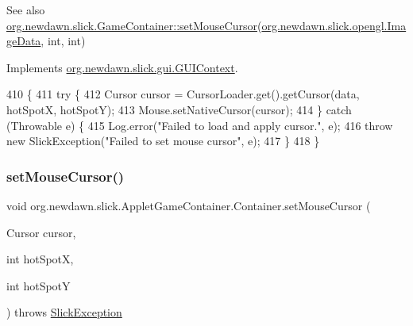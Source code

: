 \begin{DoxySeeAlso}{See also}
\mbox{\hyperlink{classorg_1_1newdawn_1_1slick_1_1_game_container_a13e789e67755f14bad1caf70e3bd6d4e}{org.\+newdawn.\+slick.\+Game\+Container\+::set\+Mouse\+Cursor}}(\mbox{\hyperlink{interfaceorg_1_1newdawn_1_1slick_1_1opengl_1_1_image_data}{org.\+newdawn.\+slick.\+opengl.\+Image\+Data}}, int, int) 
\end{DoxySeeAlso}


Implements \mbox{\hyperlink{interfaceorg_1_1newdawn_1_1slick_1_1gui_1_1_g_u_i_context_a06020a7f3e4688fa7aa76f9c07b3958a}{org.\+newdawn.\+slick.\+gui.\+G\+U\+I\+Context}}.


\begin{DoxyCode}
410                                                                                                    \{
411          \textcolor{keywordflow}{try} \{
412             Cursor cursor = CursorLoader.get().getCursor(data, hotSpotX, hotSpotY);
413             Mouse.setNativeCursor(cursor);
414          \} \textcolor{keywordflow}{catch} (Throwable e) \{
415             Log.error(\textcolor{stringliteral}{"Failed to load and apply cursor."}, e);
416             \textcolor{keywordflow}{throw} \textcolor{keyword}{new} SlickException(\textcolor{stringliteral}{"Failed to set mouse cursor"}, e);
417          \}
418       \}
\end{DoxyCode}
\mbox{\label{classorg_1_1newdawn_1_1slick_1_1_applet_game_container_1_1_container_a94e9af2ee3d8b55e8d5a425ffb33207e}} 
\subsubsection{\texorpdfstring{set\+Mouse\+Cursor()}{setMouseCursor()}\hspace{0.1cm}{\footnotesize\ttfamily [4/4]}}
{\footnotesize\ttfamily void org.\+newdawn.\+slick.\+Applet\+Game\+Container.\+Container.\+set\+Mouse\+Cursor (\begin{DoxyParamCaption}\item[{Cursor}]{cursor,  }\item[{int}]{hot\+SpotX,  }\item[{int}]{hot\+SpotY }\end{DoxyParamCaption}) throws \mbox{\hyperlink{classorg_1_1newdawn_1_1slick_1_1_slick_exception}{Slick\+Exception}}\hspace{0.3cm}{\ttfamily [inline]}}

